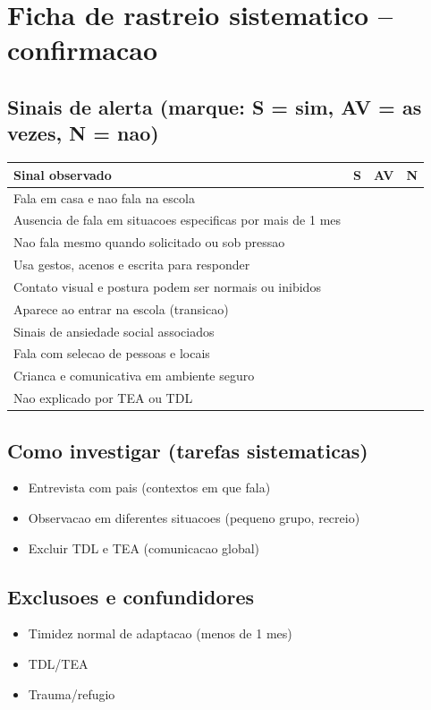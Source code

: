 \documentclass[a4paper,11pt]{book}
\begin{document}
\section*{Ficha de rastreio sistematico -- confirmacao}
\subsection*{Sinais de alerta (marque: S = sim, AV = as vezes, N = nao)}
\begin{tabular}{@{}p{11.5cm}ccc@{}}\toprule
Sinal observado & S & AV & N \\\midrule
Fala em casa e nao fala na escola & & & \\
Ausencia de fala em situacoes especificas por mais de 1 mes & & & \\
Nao fala mesmo quando solicitado ou sob pressao & & & \\
Usa gestos, acenos e escrita para responder & & & \\
Contato visual e postura podem ser normais ou inibidos & & & \\
Aparece ao entrar na escola (transicao) & & & \\
Sinais de ansiedade social associados & & & \\
Fala com selecao de pessoas e locais & & & \\
Crianca e comunicativa em ambiente seguro & & & \\
Nao explicado por TEA ou TDL & & & \\
\bottomrule\end{tabular}
\subsection*{Como investigar (tarefas sistematicas)}
\begin{itemize}
\item Entrevista com pais (contextos em que fala)
\item Observacao em diferentes situacoes (pequeno grupo, recreio)
\item Excluir TDL e TEA (comunicacao global)
\end{itemize}
\subsection*{Exclusoes e confundidores}
\begin{itemize}
\item Timidez normal de adaptacao (menos de 1 mes)
\item TDL/TEA
\item Trauma/refugio
\end{itemize}
\end{document}
